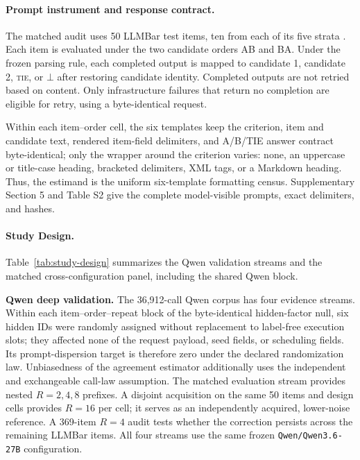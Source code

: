 \documentclass[letterpaper]{article}
\newcommand{\1}{\mathbf 1}
\begin{document}
\paragraph{Prompt instrument and response contract.}

The matched audit uses 50 LLMBar test items, ten from each of its five strata
\citep{zeng2024llmbar}. Each item is evaluated under the two candidate orders
AB and BA. Under the frozen parsing rule, each completed output is mapped to candidate 1, candidate 2, \textsc{tie}, or $\bot$ after restoring candidate identity. Completed outputs are not retried based on content. Only infrastructure failures that return no completion are eligible for retry, using a byte-identical request.

Within each item--order cell, the six templates keep the criterion, item and
candidate text, rendered item-field delimiters, and A/B/TIE answer contract
byte-identical; only the wrapper around the criterion varies: none, an
uppercase or title-case heading, bracketed
delimiters, XML tags, or a Markdown heading. Thus, the estimand is the uniform
six-template formatting census. Supplementary Section 5 and Table S2 give the complete
model-visible prompts, exact delimiters, and hashes.

\paragraph{Study Design.}


Table~\ref{tab:study-design} summarizes the Qwen validation streams and the
matched cross-configuration panel, including the shared Qwen block.

\textbf{Qwen deep validation.}
The 36,912-call Qwen corpus has four evidence streams. Within each
item--order--repeat block of the byte-identical hidden-factor null, six hidden
IDs were randomly assigned without replacement to label-free execution slots;
they affected none of the request payload, seed fields, or scheduling fields. Its prompt-dispersion
target is therefore zero under the declared randomization law. Unbiasedness of
the agreement estimator additionally uses the independent and exchangeable
call-law assumption. The matched evaluation stream provides nested
$R=2,4,8$ prefixes. A disjoint acquisition on the same 50 items and design
cells provides $R=16$ per cell; it serves as an independently acquired,
lower-noise reference. A 369-item $R=4$ audit tests whether the correction persists across the remaining LLMBar items. All four streams use the same frozen
\texttt{Qwen/Qwen3.6-27B} configuration.
\end{document}

